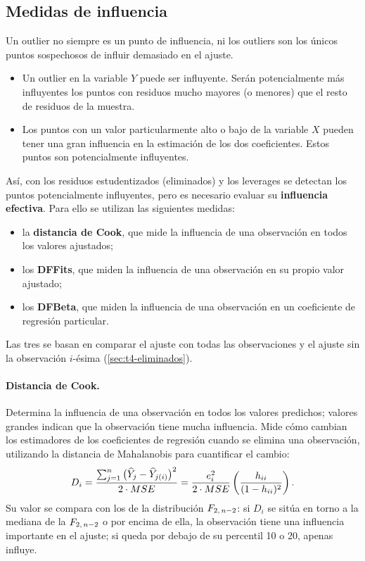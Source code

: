\subsection{Medidas de influencia}

Un outlier no siempre es un punto de influencia, ni los outliers son los únicos puntos
sospechosos de influir demasiado en el ajuste.
\begin{itemize}
  \item Un outlier en la variable $Y$ puede ser influyente. Serán potencialmente más influyentes
    los puntos con residuos mucho mayores (o menores) que el resto de residuos de la muestra.
  \item Los puntos con un valor particularmente alto o bajo de la variable $X$ pueden tener una
    gran influencia en la estimación de los dos coeficientes. Estos puntos son potencialmente
    influyentes.
\end{itemize}
Así, con los residuos estudentizados (eliminados) y los leverages se detectan los puntos
potencialmente influyentes, pero es necesario evaluar su \textbf{influencia efectiva}. Para ello
se utilizan las siguientes medidas:
\begin{itemize}
  \item la \textbf{distancia de Cook}, que mide la influencia de una observación en todos los
    valores ajustados;
  \item los \textbf{DFFits}, que miden la influencia de una observación en su propio valor
    ajustado;
  \item los \textbf{DFBeta}, que miden la influencia de una observación en un coeficiente de
    regresión particular.
\end{itemize}
Las tres se basan en comparar el ajuste con todas las observaciones y el ajuste sin la
observación $i$-ésima (\cref{sec:t4-eliminados}).

\paragraph{Distancia de Cook.} Determina la influencia de una observación en todos los valores
predichos; valores grandes indican que la observación tiene mucha influencia. Mide cómo cambian
los estimadores de los coeficientes de regresión cuando se elimina una observación, utilizando la
distancia de Mahalanobis para cuantificar el cambio:
\[
  D_i = \frac{\sum_{j=1}^n\big(\widehat{Y}_j-\widehat{Y}_{j(i)}\big)^2}{2\cdot MSE}
  = \frac{e_i^2}{2\cdot MSE}\left(\frac{h_{ii}}{(1-h_{ii})^2}\right).
\]
Su valor se compara con los de la distribución $F_{2,\,n-2}$: si $D_i$ se sitúa en torno a la
mediana de la $F_{2,\,n-2}$ o por encima de ella, la observación tiene una influencia
importante en el ajuste; si queda por debajo de su percentil 10 o 20, apenas influye.

